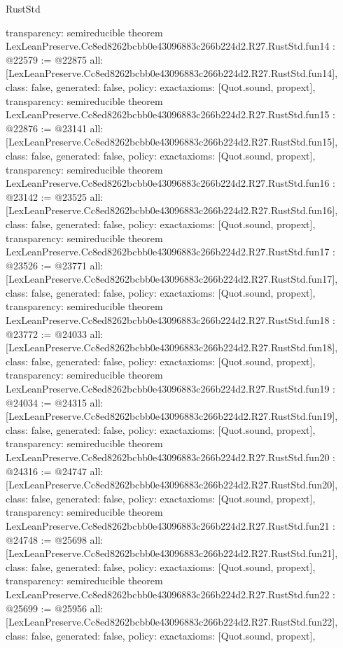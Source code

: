 \begin{lexlean}{RustStd}
\begin{coremodule}
{  transparency: semireducible
}
theorem LexLeanPreserve.Cc8ed8262bcbb0e43096883c266b224d2.R27.RustStd.fun14 : @22579 := @22875 {
  all: [LexLeanPreserve.Cc8ed8262bcbb0e43096883c266b224d2.R27.RustStd.fun14],
  class: false,
  generated: false,
  policy: exact{axioms: [Quot.sound, propext]},
  transparency: semireducible
}
theorem LexLeanPreserve.Cc8ed8262bcbb0e43096883c266b224d2.R27.RustStd.fun15 : @22876 := @23141 {
  all: [LexLeanPreserve.Cc8ed8262bcbb0e43096883c266b224d2.R27.RustStd.fun15],
  class: false,
  generated: false,
  policy: exact{axioms: [Quot.sound, propext]},
  transparency: semireducible
}
theorem LexLeanPreserve.Cc8ed8262bcbb0e43096883c266b224d2.R27.RustStd.fun16 : @23142 := @23525 {
  all: [LexLeanPreserve.Cc8ed8262bcbb0e43096883c266b224d2.R27.RustStd.fun16],
  class: false,
  generated: false,
  policy: exact{axioms: [Quot.sound, propext]},
  transparency: semireducible
}
theorem LexLeanPreserve.Cc8ed8262bcbb0e43096883c266b224d2.R27.RustStd.fun17 : @23526 := @23771 {
  all: [LexLeanPreserve.Cc8ed8262bcbb0e43096883c266b224d2.R27.RustStd.fun17],
  class: false,
  generated: false,
  policy: exact{axioms: [Quot.sound, propext]},
  transparency: semireducible
}
theorem LexLeanPreserve.Cc8ed8262bcbb0e43096883c266b224d2.R27.RustStd.fun18 : @23772 := @24033 {
  all: [LexLeanPreserve.Cc8ed8262bcbb0e43096883c266b224d2.R27.RustStd.fun18],
  class: false,
  generated: false,
  policy: exact{axioms: [Quot.sound, propext]},
  transparency: semireducible
}
theorem LexLeanPreserve.Cc8ed8262bcbb0e43096883c266b224d2.R27.RustStd.fun19 : @24034 := @24315 {
  all: [LexLeanPreserve.Cc8ed8262bcbb0e43096883c266b224d2.R27.RustStd.fun19],
  class: false,
  generated: false,
  policy: exact{axioms: [Quot.sound, propext]},
  transparency: semireducible
}
theorem LexLeanPreserve.Cc8ed8262bcbb0e43096883c266b224d2.R27.RustStd.fun20 : @24316 := @24747 {
  all: [LexLeanPreserve.Cc8ed8262bcbb0e43096883c266b224d2.R27.RustStd.fun20],
  class: false,
  generated: false,
  policy: exact{axioms: [Quot.sound, propext]},
  transparency: semireducible
}
theorem LexLeanPreserve.Cc8ed8262bcbb0e43096883c266b224d2.R27.RustStd.fun21 : @24748 := @25698 {
  all: [LexLeanPreserve.Cc8ed8262bcbb0e43096883c266b224d2.R27.RustStd.fun21],
  class: false,
  generated: false,
  policy: exact{axioms: [Quot.sound, propext]},
  transparency: semireducible
}
theorem LexLeanPreserve.Cc8ed8262bcbb0e43096883c266b224d2.R27.RustStd.fun22 : @25699 := @25956 {
  all: [LexLeanPreserve.Cc8ed8262bcbb0e43096883c266b224d2.R27.RustStd.fun22],
  class: false,
  generated: false,
  policy: exact{axioms: [Quot.sound, propext]},
}
\end{coremodule}
\end{lexlean}
